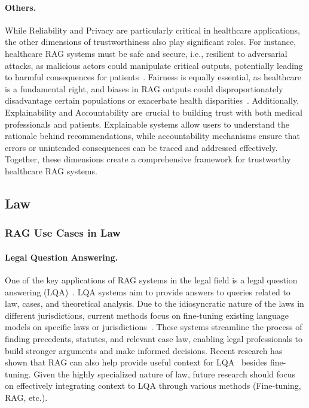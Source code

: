 \paragraph{Others.}
While Reliability and Privacy are particularly critical in healthcare applications, the other dimensions of trustworthiness also play significant roles. For instance, healthcare RAG systems must be safe and secure, i.e., resilient to adversarial attacks, as malicious actors could manipulate critical outputs, potentially leading to harmful consequences for patients~\cite{GhaffariLaleh2022Adversarial}. Fairness is equally essential, as healthcare is a fundamental right, and biases in RAG outputs could disproportionately disadvantage certain populations or exacerbate health disparities~\cite{HE2025102963}. Additionally, Explainability and Accountability are crucial to building trust with both medical professionals and patients. Explainable systems allow users to understand the rationale behind recommendations, while accountability mechanisms ensure that errors or unintended consequences can be traced and addressed effectively. Together, these dimensions create a comprehensive framework for trustworthy healthcare RAG systems.

\subsection{Law}
\subsubsection{RAG Use Cases in Law}
\paragraph{Legal Question Answering.}
One of the key applications of RAG systems in the legal field is a legal question answering (LQA)~\cite{lai2023largelanguagemodelslaw, chen2024survey}. LQA systems aim to provide answers to queries related to law, cases, and theoretical analysis. Due to the idiosyncratic nature of the laws in different jurisdictions, current methods focus on fine-tuning existing language models on specific laws or jurisdictions~\cite{ahmad-etal-2020-policyqa, mansouri2023falqufindinganswerslegal, abdallah2023exploring}. These systems streamline the process of finding precedents, statutes, and relevant case law, enabling legal professionals to build stronger arguments and make informed decisions. Recent research has shown that RAG can also help provide useful context for LQA~\cite{Wiratunga2023CBR} besides fine-tuning. Given the highly specialized nature of law, future research should focus on effectively integrating context to LQA through various methods (Fine-tuning, RAG, etc.). 

